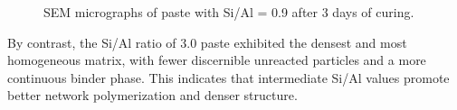 \begin{figure}[H]
  \centering
  \caption{SEM micrographs of paste with Si/Al = 0.9 after 3 days of curing.}
  \label{fig:si_al_0-9_spot5}
\end{figure}

By contrast, the Si/Al ratio of 3.0 paste exhibited the densest and most homogeneous matrix, with fewer discernible unreacted particles and a more continuous binder phase.
This indicates that intermediate Si/Al values promote better network polymerization and denser structure.

